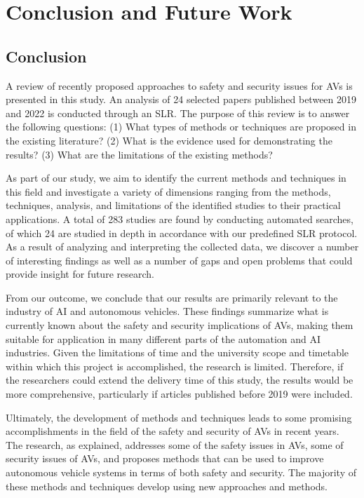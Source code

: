 \documentclass[a4paper,12pt]{article}
\begin{document}
\newpage

\section{Conclusion and Future Work}
\label{Conclusions and Future Work}
\subsection{Conclusion}
\hspace{5mm} A review of recently proposed approaches to safety and security issues for AVs is presented in this study. An analysis of 24 selected papers published between 2019 and 2022 is conducted through an SLR. The purpose of this review is to answer the following questions: (1) What types of methods or techniques are proposed in the existing literature? (2) What is the evidence used for demonstrating the results? (3) What are the limitations of the existing methods?\par
As part of our study, we aim to identify the current methods and techniques in this field and investigate a variety of dimensions ranging from the methods, techniques, analysis, and limitations of the identified studies to their practical applications. A total of 283 studies are found by conducting automated searches, of which 24 are studied in depth in accordance with our predefined SLR protocol. As a result of analyzing and interpreting the collected data, we discover a number of interesting findings as well as a number of gaps and open problems that could provide insight for future research.\par

From our outcome, we conclude that our results are primarily relevant to the industry of AI and autonomous vehicles. These findings summarize what is currently known about the safety and security implications of AVs, making them suitable for application in many different parts of the automation and AI industries. Given the limitations of time and the university scope and timetable within which this project is accomplished, the research is limited. Therefore, if the researchers could extend the delivery time of this study, the results would be more comprehensive, particularly if articles published before 2019 were included.\par

Ultimately, the development of methods and techniques leads to some promising accomplishments in the field of the safety and security of AVs in recent years. The research, as explained, addresses some of the safety issues in AVs, some of security issues of AVs, and proposes methods that can be used to improve autonomous vehicle systems in terms of both safety and security. The majority of these methods and techniques develop using new approaches and methods.\par
\end{document}
